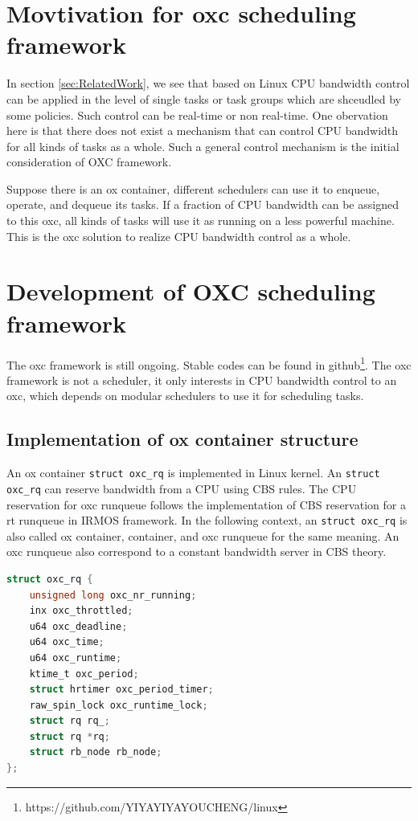 \section{Movtivation for oxc scheduling framework}
In section \ref{sec:RelatedWork}, we see that based on Linux CPU bandwidth 
control can be applied in the level of single tasks or task groups which 
are shceudled by some policies. Such control can be real-time or non real-time.
One obervation here is that there does not exist a mechanism that can
control CPU bandwidth for all kinds of tasks as a whole.
Such a general control mechanism is the initial consideration of
OXC framework.

Suppose there is an ox container, different schedulers can use it to enqueue,
operate, and dequeue its tasks. If a fraction of CPU bandwidth can be assigned
to this oxc, all kinds of tasks will use it as running on a less powerful
machine. This is the oxc solution to realize CPU bandwidth control as a whole.


\section{Development of OXC scheduling framework}
The oxc framework is still ongoing. Stable codes can be found 
in github\footnote{https://github.com/YIYAYIYAYOUCHENG/linux}.
The oxc framework is not a scheduler, it only interests in CPU bandwidth
control to an oxc, which depends on modular schedulers to use it for 
scheduling tasks.

\subsection{Implementation of ox container structure}
An ox container \texttt{struct oxc\_rq} is implemented in Linux kernel.
An \texttt{struct oxc\_rq} can reserve bandwidth from a CPU using CBS
rules. The CPU reservation for oxc runqueue follows the implementation
of CBS reservation for a rt runqueue in IRMOS framework. 
In the following context, an \texttt{struct oxc\_rq} is also called ox 
container, container, and oxc runqueue for the same meaning. An oxc runqueue
also correspond to a constant bandwidth server in CBS theory. 
\begin{lstlisting}[language=C, caption={\texttt{struct oxc\_rq}},
                        label={oxc_rq}]
struct oxc_rq {
	unsigned long oxc_nr_running;
	inx oxc_throttled;
	u64 oxc_deadline;
	u64 oxc_time;
	u64 oxc_runtime;
	ktime_t oxc_period;
	struct hrtimer oxc_period_timer;
	raw_spin_lock oxc_runtime_lock;
	struct rq rq_;
	struct rq *rq;
	struct rb_node rb_node;
};
\end{lstlisting}

